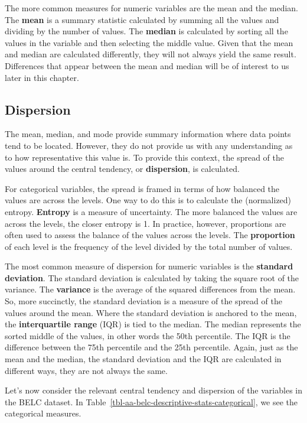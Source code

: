 \documentclass[
  letterpaper,
  DIV=11,
  numbers=noendperiod]{scrreprt}
\theoremstyle{definition}
\theoremstyle{remark}
\begin{document}
The more common measures for numeric variables are the mean and the
median. The \textbf{mean} is a summary statistic calculated by summing
all the values and dividing by the number of values. The \textbf{median}
is calculated by sorting all the values in the variable and then
selecting the middle value. Given that the mean and median are
calculated differently, they will not always yield the same result.
Differences that appear between the mean and median will be of interest
to us later in this chapter.

\subsection{Dispersion}\label{dispersion}

The mean, median, and mode provide summary information where data points
tend to be located. However, they do not provide us with any
understanding as to how representative this value is. To provide this
context, the spread of the values around the central tendency, or
\textbf{dispersion}, is calculated.

For categorical variables, the spread is framed in terms of how balanced
the values are across the levels. One way to do this is to calculate the
(normalized) entropy. \textbf{Entropy} is a measure of uncertainty. The
more balanced the values are across the levels, the closer entropy is 1.
In practice, however, proportions are often used to assess the balance
of the values across the levels. The \textbf{proportion} of each level
is the frequency of the level divided by the total number of values.

The most common measure of dispersion for numeric variables is the
\textbf{standard deviation}. The standard deviation is calculated by
taking the square root of the variance. The \textbf{variance} is the
average of the squared differences from the mean. So, more succinctly,
the standard deviation is a measure of the spread of the values around
the mean. Where the standard deviation is anchored to the mean, the
\textbf{interquartile range} (IQR) is tied to the median. The median
represents the sorted middle of the values, in other words the 50th
percentile. The IQR is the difference between the 75th percentile and
the 25th percentile. Again, just as the mean and the median, the
standard deviation and the IQR are calculated in different ways, they
are not always the same.

Let's now consider the relevant central tendency and dispersion of the
variables in the BELC dataset. In
Table~\ref{tbl-aa-belc-descriptive-stats-categorical}, we see the
categorical measures.
\end{document}
